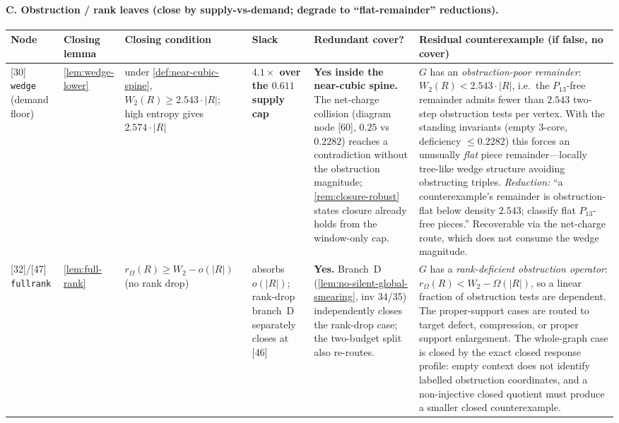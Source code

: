 \documentclass[11pt]{article}
\begin{document}
\paragraph{C. Obstruction / rank leaves (close by supply-vs-demand; degrade to ``flat-remainder'' reductions).}
{\scriptsize\setlength{\tabcolsep}{3pt}
\begin{longtable}{L{0.09\textwidth} L{0.095\textwidth} L{0.15\textwidth} L{0.08\textwidth} L{0.105\textwidth} L{0.335\textwidth}}
\toprule
\textbf{Node} & \textbf{Closing lemma} & \textbf{Closing condition} & \textbf{Slack} & \textbf{Redundant cover?} & \textbf{Residual counterexample (if false, no cover)} \\
\midrule
\endhead
{[30]} \texttt{wedge} (demand floor) & \cref{lem:wedge-lower} & under \cref{def:near-cubic-spine}, $W_2(R)\ge2.543\cdot|R|$; high entropy gives $2.574\cdot|R|$ & \textbf{$4.1\times$ over the $0.611$ supply cap} & \textbf{Yes inside the near-cubic spine.} The net-charge collision (diagram node {[60]}, $0.25$ vs $0.2282$) reaches a contradiction without the obstruction magnitude; \cref{rem:closure-robust} states closure already holds from the window-only cap. & $G$ has an \emph{obstruction-poor remainder}: $W_2(R)<2.543\cdot|R|$, i.e.\ the $P_{13}$-free remainder admits fewer than $2.543$ two-step obstruction tests per vertex. With the standing invariants (empty $3$-core, deficiency $\le0.2282$) this forces an unusually \emph{flat} piece remainder---locally tree-like wedge structure avoiding obstructing triples. \emph{Reduction:} ``a counterexample's remainder is obstruction-flat below density $2.543$; classify flat $P_{13}$-free pieces.'' Recoverable via the net-charge route, which does not consume the wedge magnitude. \\
{[32]}/{[47]} \texttt{fullrank} & \cref{lem:full-rank} & $r_\Omega(R)\ge W_2-o(|R|)$ (no rank drop) & absorbs $o(|R|)$; rank-drop branch~D separately closes at {[46]} & \textbf{Yes.} Branch~D (\cref{lem:no-silent-global-smearing}, inv 34/35) independently closes the rank-drop case; the two-budget split also re-routes. & $G$ has a \emph{rank-deficient obstruction operator}: $r_\Omega(R)<W_2-\Omega(|R|)$, so a linear fraction of obstruction tests are dependent. The proper-support cases are routed to target defect, compression, or proper support enlargement. The whole-graph case is closed by the exact closed response profile: empty context does not identify labelled obstruction coordinates, and a non-injective closed quotient must produce a smaller closed counterexample. \\

\end{longtable}}
\end{document}
